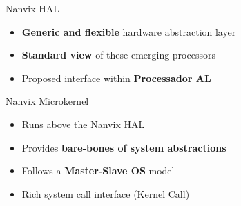 		\begin{frame}[fragile]{Nanvix HAL}

			\begin{itemize}
				\item \textbf{Generic and flexible} hardware abstraction layer
				\item \textbf{Standard view} of these emerging processors
				\item Proposed interface within \textbf{Processador AL}
			\end{itemize}


		\end{frame}

		\begin{frame}[fragile]{Nanvix Microkernel}

			\begin{itemize}
				\item Runs above the Nanvix HAL
				\item Provides \textbf{bare-bones of system abstractions}
				\item Follows a \textbf{Master-Slave OS} model
				\item Rich system call interface (Kernel Call)
			\end{itemize}


		\end{frame}

